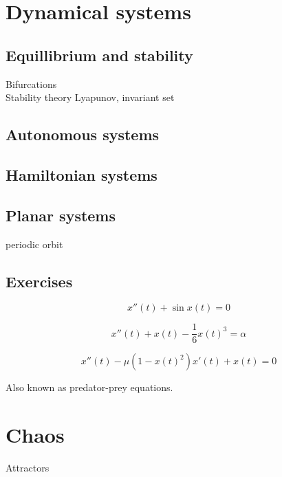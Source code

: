 \documentclass{../note}
\begin{document}
\chapter{Dynamical systems}
\section{Equillibrium and stability}
Bifurcations\\
Stability theory
Lyapunov, invariant set

\section{Autonomous systems}


\section{Hamiltonian systems}

\section{Planar systems}
periodic orbit


\begin{prb}
\end{prb}

\section*{Exercises}
\begin{prb}
\[x''(t)+\sin x(t)=0\]
\end{prb}
\begin{prb}
\[x''(t)+x(t)-\frac16x(t)^3=\alpha\]
\end{prb}

\begin{prb}
\[x''(t)-\mu(1-x(t)^2)x'(t)+x(t)=0\]
\end{prb}

\begin{prb}
Also known as predator-prey equations.
\end{prb}


\chapter{Chaos}
Attractors
\end{document}
